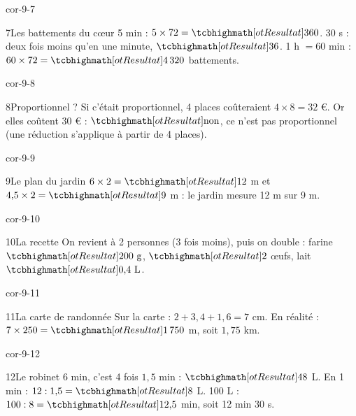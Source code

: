\begin{blocLivre}{cor-9-7}\begin{corrige}{7}{Les battements du cœur}
5 min : $5\times72=\res{360}$. 30 s : deux fois moins qu’en une minute, $\res{36}$. 1 h $=60$ min : $60\times72=\res{4\,320}$ battements.
\end{corrige}\end{blocLivre}
\begin{blocLivre}{cor-9-8}\begin{corrige}{8}{Proportionnel ?}
Si c’était proportionnel, 4 places coûteraient $4\times8=32$ €. Or elles coûtent 30 € : $\res{\text{non}}$, ce n’est pas proportionnel (une réduction s’applique à partir de 4 places).
\end{corrige}\end{blocLivre}
\begin{blocLivre}{cor-9-9}\begin{corrige}{9}{Le plan du jardin}
$6\times2=\res{12}$ m et $4{,}5\times2=\res9$ m : le jardin mesure 12 m sur 9 m.
\label{fig-cor-9-9}
\end{corrige}\end{blocLivre}
\begin{blocLivre}{cor-9-10}\begin{corrige}{10}{La recette}
On revient à 2 personnes (3 fois moins), puis on double : farine $\res{200\ \mathrm{g}}$, $\res{2}$ œufs, lait $\res{0{,}4\ \mathrm{L}}$.
\end{corrige}\end{blocLivre}
\begin{blocLivre}{cor-9-11}\begin{corrige}{11}{La carte de randonnée}
Sur la carte : $2+3{,}4+1{,}6=7$ cm. En réalité : $7\times250=\res{1\,750}$ m, soit $1{,}75$ km.
\label{fig-cor-9-11}
\end{corrige}\end{blocLivre}
\begin{blocLivre}{cor-9-12}\begin{corrige}{12}{Le robinet}
6 min, c’est 4 fois $1{,}5$ min : $\res{48}$ L. En 1 min : $12:1{,}5=\res8$ L. 100 L : $100:8=\res{12{,}5}$ min, soit 12 min 30 s.
\end{corrige}\end{blocLivre}
